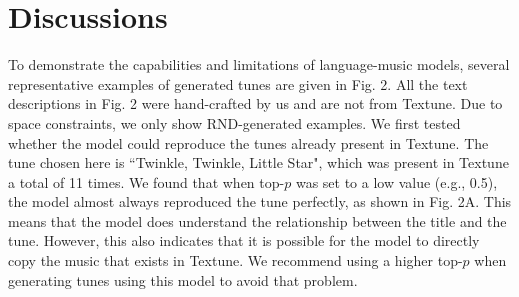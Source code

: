 \documentclass[letterpaper]{article} %
\begin{document}
\section{Discussions}
To demonstrate the capabilities and limitations of language-music models, several representative examples of generated tunes are given in Fig. 2. All the text descriptions in Fig. 2 were hand-crafted by us and are not from Textune. Due to space constraints, we only show RND-generated examples.  We first tested whether the model could reproduce the tunes already present in Textune. The tune chosen here is ``Twinkle, Twinkle, Little Star", which was present in Textune a total of 11 times. We found that when top-$p$ was set to a low value (e.g., 0.5), the model almost always reproduced the tune perfectly, as shown in Fig. 2A. This means that the model does understand the relationship between the title and the tune. However, this also indicates that it is possible for the model to directly copy the music that exists in Textune. We recommend using a higher top-$p$ when generating tunes using this model to avoid that problem.
\end{document}
